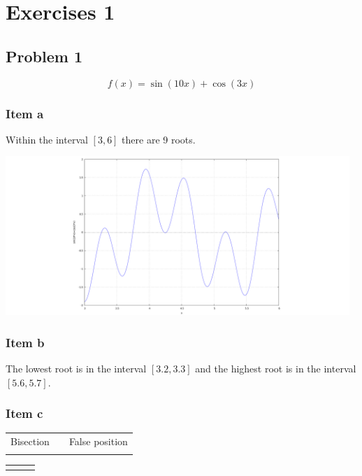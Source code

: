 \chapter{Exercises 1}
\section{Problem 1}
\begin{equation*}
	f(x)=\sin(10x)+\cos(3x)
\end{equation*}
\subsection{Item a}
Within the interval $[3,6]$ there are 9 roots.
\begin{center} \includegraphics[height=60mm,keepaspectratio]{EXER1T1-1-a} \end{center}

\subsection{Item b}
The lowest root is in the interval $[3.2,3.3]$ and the highest root is in the interval $[5.6,5.7]$.
\newpage

\subsection{Item c}
\begin{center}
\begin{tabular}{ p{73mm} p{0mm} p{73mm} }
	Bisection & & False position \\
	 & &
	
\end{tabular}
\end{center}

\begin{center}
\begin{tabular}{ p{73mm} p{0mm} p{73mm} }
	
	& &
	
\end{tabular}
\end{center}
